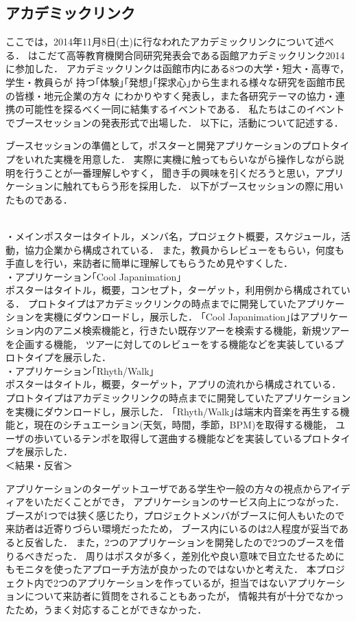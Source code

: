 \subsection{アカデミックリンク}
\par
ここでは，2014年11月8日(土)に行なわれたアカデミックリンクについて述べる．
はこだて高等教育機関合同研究発表会である函館アカデミックリンク2014に参加した．
アカデミックリンクは函館市内にある8つの大学・短大・高専で，学生・教員らが
持つ｢体験｣｢発想｣｢探求心｣から生まれる様々な研究を函館市民の皆様・地元企業の方々
にわかりやすく発表し，また各研究テーマの協力・連携の可能性を探るべく一同に結集するイベントである．
私たちはこのイベントでブースセッションの発表形式で出場した．
以下に，活動について記述する．
\par
ブースセッションの準備として，ポスターと開発アプリケーションのプロトタイプをいれた実機を用意した．
実際に実機に触ってもらいながら操作しながら説明を行うことが一番理解しやすく，
聞き手の興味を引くだろうと思い，アプリケーションに触れてもらう形を採用した．
以下がブースセッションの際に用いたものである．

\\
・メインポスターはタイトル，メンバ名，プロジェクト概要，スケジュール，活動，協力企業から構成されている．
また，教員からレビューをもらい，何度も手直しを行い，来訪者に簡単に理解してもらうため見やすくした．
\\
・アプリケーション｢Cool Japanimation｣\\
ポスターはタイトル，概要，コンセプト，ターゲット，利用例から構成されている．
プロトタイプはアカデミックリンクの時点までに開発していたアプリケーションを実機にダウンロードし，展示した．
｢Cool Japanimation｣はアプリケーション内のアニメ検索機能と，行きたい既存ツアーを検索する機能，新規ツアーを企画する機能，
ツアーに対してのレビューをする機能などを実装しているプロトタイプを展示した．
\\
・アプリケーション｢Rhyth/Walk｣\\
ポスターはタイトル，概要，ターゲット，アプリの流れから構成されている．
プロトタイプはアカデミックリンクの時点までに開発していたアプリケーションを実機にダウンロードし，展示した．
｢Rhyth/Walk｣は端末内音楽を再生する機能と，現在のシチュエーション(天気，時間，季節，BPM)を取得する機能，
ユーザの歩いているテンポを取得して選曲する機能などを実装しているプロトタイプを展示した．
\\
＜結果・反省＞
\par
アプリケーションのターゲットユーザである学生や一般の方々の視点からアイディアをいただくことができ，
アプリケーションのサービス向上につながった．
ブースが1つでは狭く感じたり，プロジェクトメンバがブースに何人もいたので来訪者は近寄りづらい環境だったため，
ブース内にいるのは2人程度が妥当であると反省した．
また，2つのアプリケーションを開発したので2つのブースを借りるべきだった．
周りはポスタが多く，差別化や良い意味で目立たせるためにもモニタを使ったアプローチ方法が良かったのではないかと考えた．
本プロジェクト内で2つのアプリケーションを作っているが，担当ではないアプリケーションについて来訪者に質問をされることもあったが，
情報共有が十分でなかったため，うまく対応することができなかった．

\par
